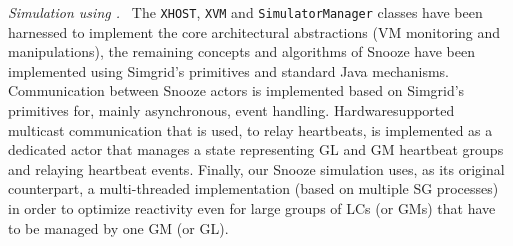 \emph{Simulation using \vmps.~} The \texttt{XHOST}, \texttt{XVM} and
\texttt{SimulatorManager} classes have been harnessed to implement the
core architectural abstractions (\ie VM monitoring and manipulations),
the remaining concepts and algorithms of Snooze have been implemented
using Simgrid's primitives and standard Java mechanisms.
%
Communication between Snooze actors is implemented based on Simgrid's
primitives for, mainly asynchronous, event handling.
Hardware\-sup\-ported multicast communication that is used, \eg
to relay heartbeats, is implemented as a dedicated actor that manages
a state representing GL and GM heartbeat groups and relaying heartbeat
events.
%
Finally, our Snooze simulation uses, as its original counterpart, a
multi-threaded implementation (\ie based on multiple SG processes) in
order to optimize reactivity even for large groups of LCs (or GMs)
that have to be managed by one GM (or GL).







